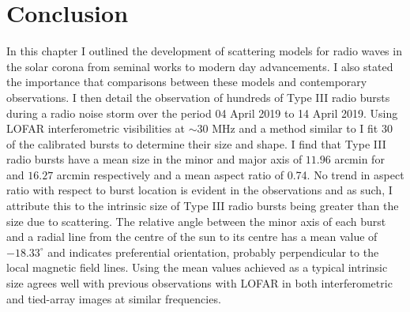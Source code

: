 \section{Conclusion}
In this chapter I outlined the development of scattering models for radio waves in the solar corona from seminal works to modern day advancements. I also stated the importance that comparisons between these models and contemporary observations. I then detail the observation of hundreds of Type III radio bursts during a radio noise storm over the period 04 April 2019 to 14 April 2019. Using LOFAR interferometric visibilities at $\sim 30$ MHz and a method similar to \cite{Murphy2021} I fit 30 of the calibrated bursts to determine their size and shape. I find that Type III radio bursts have a mean size in the minor and major axis of $11.96$ arcmin for and $16.27$ arcmin respectively and a mean aspect ratio of 0.74. No trend in aspect ratio with respect to burst location is evident in the observations and as such, I attribute this to the intrinsic size of Type III radio bursts being greater than the size due to scattering. The relative angle between the minor axis of each burst and a radial line from the centre of the sun to its centre has a mean value of $-18.33^\circ$ and indicates preferential orientation, probably perpendicular to the local magnetic field lines. Using the mean values achieved as a typical intrinsic size agrees well with previous observations with LOFAR in both interferometric and tied-array images at similar frequencies.

